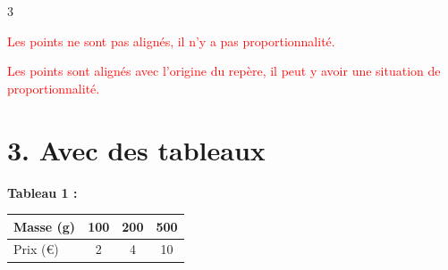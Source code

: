 \documentclass[a4paper]{book}
\begin{document}
{\begin{exerciceNote}{3}
\begin{minipage}{0.30\linewidth}
            \dotfill 
            
            \textcolor{red}{Les points ne sont pas alignés, il n'y a pas proportionnalité.}
        \end{minipage}        
        \hfill\vline\hfill
        \begin{minipage}{0.30\linewidth}
            \begin{center}
            \end{center}    

            \dotfill 
            
            \textcolor{red}{Les points sont alignés avec l'origine du repère, il peut y avoir une situation de proportionnalité.}
        \end{minipage}

        \section*{3. Avec des tableaux}

        \begin{minipage}{0.45\linewidth}
            \begin{center}
                \textbf{Tableau 1 :} \begin{tabular}{|l|c|c|c|} 
                \hline Masse (g) & 100 & 200 & 500 \\ 
                \hline Prix (€) & 2 & 4 & 10 \\ \hline 
                \end{tabular}
            \end{center}

            \medskip


\end{minipage}
\end{exerciceNote}}
\end{document}
